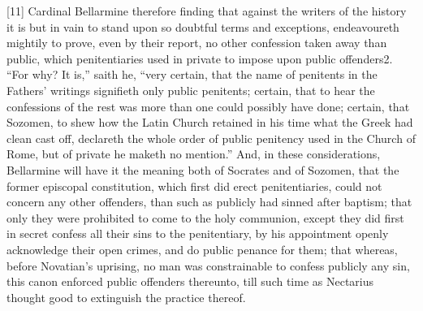 [11] Cardinal Bellarmine therefore finding that against the writers of the history it is but in vain to stand upon so doubtful terms and exceptions, endeavoureth mightily to prove, even by their report, no other confession taken away than public, which penitentiaries used in private to impose upon public offenders2. “For why? It is,” saith he, “very  certain, that the name of penitents in the Fathers’ writings signifieth only public penitents; certain, that to hear the confessions of the rest was more than one could possibly have done; certain, that Sozomen, to shew how the Latin Church retained in his time what the Greek had clean cast off, declareth the whole order of public penitency used in the Church of Rome, but of private he maketh no mention.” And, in these considerations, Bellarmine will have it the meaning both of Socrates and of Sozomen, that the former episcopal constitution, which first did erect penitentiaries, could not concern any other offenders, than such as publicly had sinned after baptism; that only they were prohibited to come to the holy communion, except they did first in secret confess all their sins to the penitentiary, by his appointment openly acknowledge their open crimes, and do public penance for them; that whereas, before Novatian’s uprising, no man was constrainable to confess publicly any sin, this canon enforced public offenders thereunto, till such time as Nectarius thought good to extinguish the practice thereof.

